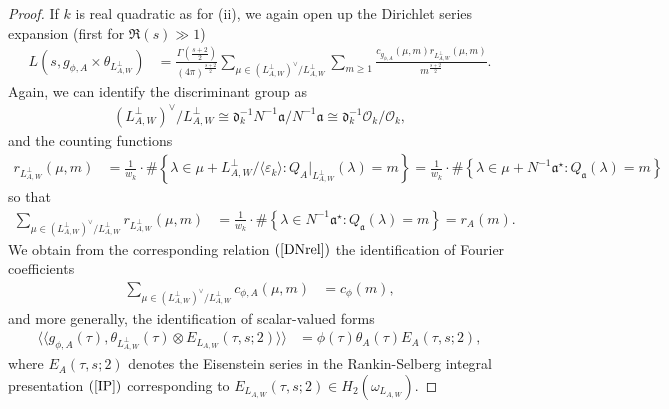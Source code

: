 \documentclass{amsart}
\theoremstyle{definition}
\theoremstyle{definition}
\theoremstyle{definition}
\begin{document}
\begin{proof}
If $k$ is real quadratic as for (ii), we again open up the Dirichlet series expansion (first for $\Re(s) \gg 1$) 
\begin{equation*}\begin{aligned} L(s, g_{\phi, A} \times \theta_{L_{A,W}^{\perp}}) 
&= \frac{ \Gamma \left( \frac{s+2}{2} \right)  }{ (4 \pi)^{ \frac{s+2}{2}  } }
\sum\limits_{ \mu \in (L_{A,W}^{\perp})^{\vee} / L_{A,W}^{\perp} } \sum\limits_{m \geq 1} 
\frac{  c_{g_{\phi, A}}(\mu, m) r_{ L_{A, W}^{\perp} }(\mu, m) }{ m^{\frac{s+2}{2} } }. \end{aligned}\end{equation*}
Again, we can identify the discriminant group as 
\begin{align*} (L_{A,W}^{\perp})^{\vee} / L_{A,W}^{\perp} \cong \mathfrak{d}_k^{-1} N^{-1} \mathfrak{a} / N^{-1} \mathfrak{a} 
\cong \mathfrak{d}_k^{-1} \mathcal{O}_k / \mathcal{O}_k, \end{align*}
and the counting functions 
\begin{align*} r_{L_{A,W}^{\perp}}(\mu, m) 
&= \frac{1}{w_k} \cdot \# \left\lbrace \lambda \in \mu + L_{A,W}^{\perp} / \langle \varepsilon_k \rangle  : Q_A\vert_{L_{A,W}^{\perp} }(\lambda) = m \right\rbrace
=\frac{1}{w_k} \cdot \# \left\lbrace \lambda \in \mu + N^{-1} \mathfrak{a}^{\star}: Q_{\mathfrak{a}}(\lambda) = m \right\rbrace \end{align*}
so that 
\begin{align*} \sum\limits_{ \mu \in (L_{A,W}^{\perp})^{\vee} / L_{A,W}^{\perp} } r_{L_{A,W}^{\perp}}(\mu, m)
&= \frac{1}{w_k} \cdot \# \left\lbrace \lambda \in N^{-1} \mathfrak{a}^{\star} : Q_{\mathfrak{a}}(\lambda) = m \right\rbrace = r_A(m). \end{align*}
We obtain from the corresponding relation $(\ref{DNrel})$ the identification of Fourier coefficients 
\begin{align*} \sum\limits_{ \mu \in (L_{A,W}^{\perp})^{\vee} / L_{A,W}^{\perp} } c_{\phi, A}(\mu, m) &= c_{\phi}(m), \end{align*}
and more generally, the identification of scalar-valued forms 
\begin{align*} \langle \langle g_{\phi, A}(\tau), \theta_{L_{A,W}^{\perp}}(\tau) \otimes E_{L_{A,W}}(\tau, s; 2) \rangle \rangle
&= \phi (\tau) \theta_A(\tau) E_A(\tau, s; 2), \end{align*}
where $E_{A}(\tau, s; 2)$ denotes the Eisenstein series in the Rankin-Selberg integral presentation $(\ref{IP})$
corresponding to $E_{L_{A,W}}(\tau, s; 2) \in H_2(\omega_{L_{A,W}})$.

\end{proof}
\end{document}
